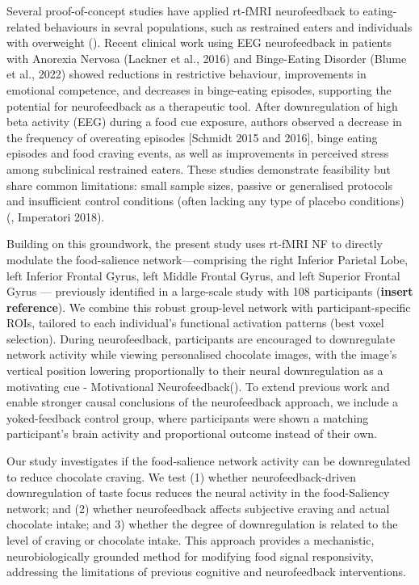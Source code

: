 \documentclass[]{imag-ms-template}
\begin{document}
Several proof-of-concept studies have applied rt-fMRI neurofeedback to eating-related behaviours in sevral populations, such as restrained eaters and individuals with overweight (\cite{schmidtNeurofeedbackReducesOvereating2015, ihssenNeurofeedbackVisualFood2017b, spetterRealtimeFMRINeurofeedback2017, blumeEEGNeurofeedbackTreatment2022}). Recent clinical work using EEG neurofeedback in patients with Anorexia Nervosa (Lackner et al., 2016) and Binge-Eating Disorder (Blume et al., 2022) showed reductions in restrictive behaviour, improvements in emotional competence, and decreases in binge-eating episodes, supporting the potential for neurofeedback as a therapeutic tool.  After downregulation of high beta activity (EEG) during a food cue exposure, authors observed a decrease in the frequency of overeating episodes [Schmidt 2015 and 2016], binge eating episodes and food craving events, as well as improvements in perceived stress among subclinical restrained eaters. These studies demonstrate feasibility but share common limitations: small sample sizes, passive or generalised protocols and insufficient control conditions (often lacking any type of placebo conditions) (\cite{bartholdyPotentialNeurofeedbackTreatment2013b}, Imperatori 2018). 

Building on this groundwork, the present study uses rt-fMRI NF to directly modulate the food-salience network—comprising the right Inferior Parietal Lobe, left Inferior Frontal Gyrus, left Middle Frontal Gyrus, and left Superior Frontal Gyrus — previously identified in a large-scale study with 108 participants (\textbf{insert reference}). We combine this robust group-level network with participant-specific ROIs, tailored to each individual’s functional activation patterns (best voxel selection). During neurofeedback, participants are encouraged to downregulate network activity while viewing personalised chocolate images, with the image’s vertical position lowering proportionally to their neural downregulation as a motivating cue - Motivational Neurofeedback(\cite{ihssenNeurofeedbackVisualFood2017}). To extend previous work and enable stronger causal conclusions of the neurofeedback approach, we include a yoked-feedback control group, where participants were shown a matching participant's brain activity and proportional outcome instead of their own.

Our study investigates if the food-salience network activity can be downregulated to reduce chocolate craving. We test (1) whether neurofeedback-driven downregulation of taste focus reduces the neural activity in the food-Saliency network; and (2) whether neurofeedback affects subjective craving  and actual chocolate intake; and 3) whether the degree of downregulation is related to the level of craving or chocolate intake. This approach provides a mechanistic, neurobiologically grounded method for modifying food signal responsivity, addressing the limitations of previous cognitive and neurofeedback interventions.
\end{document}
